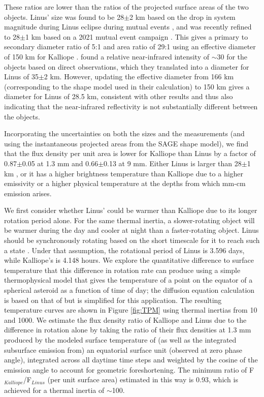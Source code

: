 \documentclass[]{aastex631}
\begin{document}
These ratios are lower than the ratios of the projected surface areas of the two objects. Linus' size was found to be 28$\pm$2 km based on the drop in system magnitude during Linus eclipse during mutual events \citep{descamps2008}, and was recently refined to 28$\pm$1 km based on a 2021 mutual event campaign \citep{broz2023}. This gives a primary to secondary diameter ratio of 5:1 and area ratio of 29:1 using an effective diameter of 150 km for Kalliope \citep{ferrais2022}. \cite{laver2009} found a relative near-infrared intensity of $\sim$30 for the objects based on direct observations, which they translated into a diameter for Linus of 35$\pm$2 km. However, updating the effective diameter from 166 km (corresponding to the shape model used in their calculation) to 150 km \citep{ferrais2022} gives a diameter for Linus of 28.5 km, consistent with other results and thus also indicating that the near-infrared reflectivity is not substantially different between the objects.

Incorporating the uncertainties on both the sizes and the measurements (and using the instantaneous projected areas from the \cite{ferrais2022} SAGE shape model), we find that the flux density per unit area is lower for Kalliope than Linus by a factor of 0.87$\pm$0.05 at 1.3 mm and 0.66$\pm$0.13 at 9 mm. Either Linus is larger than 28$\pm$1 km \citep{broz2023}, or it has a higher brightness temperature than Kalliope due to a higher emissivity or a higher physical temperature at the depths from which mm-cm emission arises. 

We first consider whether Linus' could be warmer than Kalliope due to its longer rotation period alone. For the same thermal inertia, a slower-rotating object will be warmer during the day and cooler at night than a faster-rotating object. Linus should be synchronously rotating based on the short timescale for it to reach such a state \citep{margot2003}. Under that assumption, the rotational period of Linus is 3.596 days, while Kalliope's is 4.148 hours. We explore the quantitative difference to surface temperature that this difference in rotation rate can produce using a simple thermophysical model that gives the temperature of a point on the equator of a spherical asteroid as a function of time of day; the diffusion equation calculation is based on that of \cite{dekleer2021_Ganymede} but is simplified for this application. The resulting temperature curves are shown in Figure \ref{fig:TPM} using thermal inertias from 10 and 1000. We estimate the flux density ratio of Kalliope and Linus due to the difference in rotation alone by taking the ratio of their flux densities at 1.3 mm produced by the modeled surface temperature of (as well as the integrated subsurface emission from) an equatorial surface unit (observed at zero phase angle), integrated across all daytime time steps and weighted by the cosine of the emission angle to account for geometric foreshortening. The minimum ratio of F$_{Kalliope}$/F$_{Linus}$ (per unit surface area) estimated in this way is 0.93, which is achieved for a thermal inertia of $\sim$100. 
\end{document}
